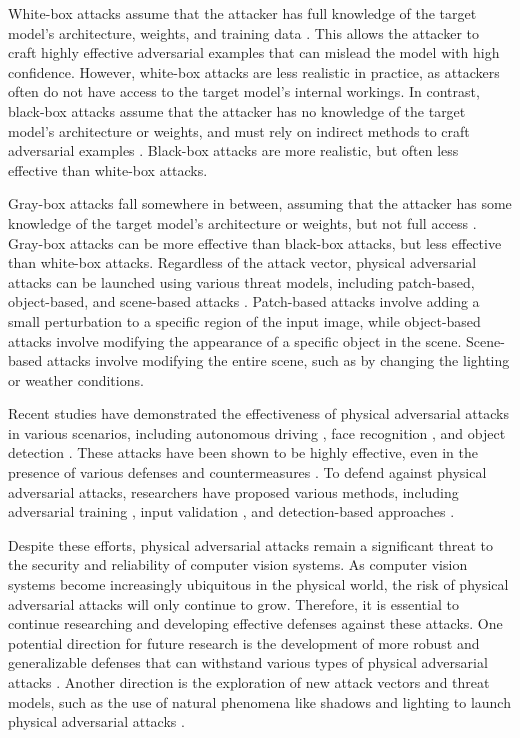 \documentclass[11pt,a4paper]{article}
\begin{document}
White-box attacks assume that the attacker has full knowledge of the target model's architecture, weights, and training data \cite{doi:10.1145/3128572.3140444}. This allows the attacker to craft highly effective adversarial examples that can mislead the model with high confidence. However, white-box attacks are less realistic in practice, as attackers often do not have access to the target model's internal workings. In contrast, black-box attacks assume that the attacker has no knowledge of the target model's architecture or weights, and must rely on indirect methods to craft adversarial examples \cite{arxiv:1904.02884}. Black-box attacks are more realistic, but often less effective than white-box attacks.

Gray-box attacks fall somewhere in between, assuming that the attacker has some knowledge of the target model's architecture or weights, but not full access \cite{doi:10.1109/cvpr42600.2020.00108}. Gray-box attacks can be more effective than black-box attacks, but less effective than white-box attacks. Regardless of the attack vector, physical adversarial attacks can be launched using various threat models, including patch-based, object-based, and scene-based attacks \cite{arxiv:1707.08945}. Patch-based attacks involve adding a small perturbation to a specific region of the input image, while object-based attacks involve modifying the appearance of a specific object in the scene. Scene-based attacks involve modifying the entire scene, such as by changing the lighting or weather conditions.

Recent studies have demonstrated the effectiveness of physical adversarial attacks in various scenarios, including autonomous driving \cite{doi:10.1109/cvpr42600.2020.01426}, face recognition \cite{doi:10.1016/j.patcog.2022.109009}, and object detection \cite{doi:10.1007/978-3-030-10925-7_4}. These attacks have been shown to be highly effective, even in the presence of various defenses and countermeasures \cite{doi:10.1109/cvpr46437.2021.00614}. To defend against physical adversarial attacks, researchers have proposed various methods, including adversarial training \cite{arxiv:1904.13000}, input validation \cite{doi:10.1609/aaai.v32i1.11828}, and detection-based approaches \cite{doi:10.1109/tnnls.2021.3105238}.

Despite these efforts, physical adversarial attacks remain a significant threat to the security and reliability of computer vision systems. As computer vision systems become increasingly ubiquitous in the physical world, the risk of physical adversarial attacks will only continue to grow. Therefore, it is essential to continue researching and developing effective defenses against these attacks. One potential direction for future research is the development of more robust and generalizable defenses that can withstand various types of physical adversarial attacks \cite{arxiv:1902.06705}. Another direction is the exploration of new attack vectors and threat models, such as the use of natural phenomena like shadows and lighting to launch physical adversarial attacks \cite{arxiv:2203.03818}.
\end{document}
